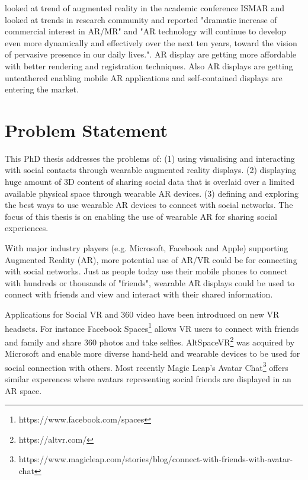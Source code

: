 \cite{Zhou2008, Kim2018} looked at trend of augmented reality in the academic conference ISMAR and looked at trends in research community and reported "dramatic increase of commercial interest in AR/MR" and "AR technology will continue to develop even more dynamically and effectively over the next ten years, toward the vision of pervasive presence in our daily lives.". AR display are getting more affordable with better rendering and registration techniques. Also AR displays are getting unteathered enabling mobile AR applications and self-contained displays are entering the market.

\section{Problem Statement}

This PhD thesis addresses the problems of: 
(1) using visualising and interacting with social contacts through wearable augmented reality displays. 
(2) displaying huge amount of 3D content of sharing social data that is overlaid over a limited available physical space through wearable AR devices. 
(3) defining and exploring the best ways to use wearable AR devices to connect with social networks.
The focus of this thesis is on enabling the use of wearable AR for sharing social experiences. 


With major industry players (e.g. Microsoft, Facebook and Apple) supporting Augmented Reality (AR), more potential use of AR/VR could be for connecting with social networks. Just as people today use their mobile phones to connect with hundreds or thousands of "friends", wearable AR displays could be used to connect with friends and view and interact with their shared information.

Applications for Social VR and 360 video have been introduced on new VR headsets. For instance Facebook Spaces\footnote{https://www.facebook.com/spaces} allows VR users to connect with friends and family and share 360 photos and take selfies. AltSpaceVR\footnote{https://altvr.com/} was acquired by Microsoft and enable more diverse hand-held and wearable devices to be used for social connection with others. Most recently Magic Leap's Avatar Chat\footnote{https://www.magicleap.com/stories/blog/connect-with-friends-with-avatar-chat} offers similar experences where avatars representing social friends are displayed in an AR space. 

